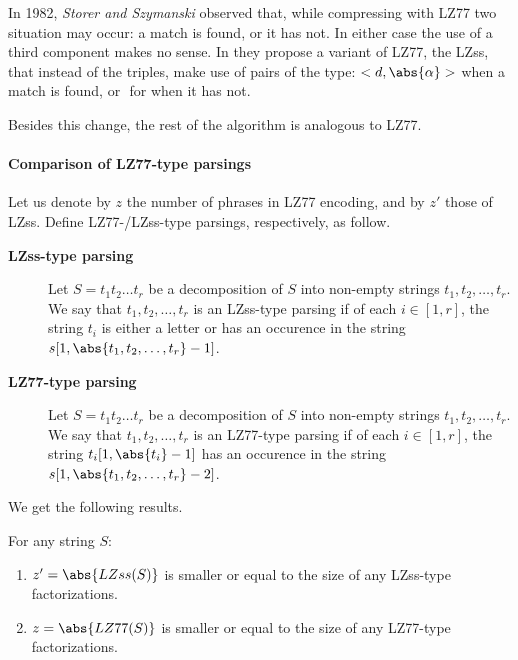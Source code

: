 \documentclass{subfiles}
\begin{document}
    In 1982, \emph{Storer \emph{and} Szymanski} observed that,
    while compressing with LZ77 two situation may occur: a match is found, or it has not.
    In either case the use of a third component makes no sense.
    In \cite{storer1982} they propose a variant of LZ77, the LZss,
    that instead of the triples, make use of pairs of the type: 
    \(<d, \abs{\alpha}>\) when a match is found, or \(<0, c>\) for when it has not.

    Besides this change, the rest of the algorithm is analogous to LZ77.
    
    \paragraph{Comparison of LZ77-type parsings}
    Let us denote by \(z\) the number of phrases in LZ77 encoding, and by \(z'\) those of LZss.
    Define LZ77-/LZss-type parsings, respectively, as follow.

    \begin{description}
        \item [\textbf{LZss-type parsing}] Let \(S = t_{1}t_{2}\ldots t_{r}\) be a decomposition of 
            \(S\) into non-empty strings \(t_{1},t_{2}, \ldots, t_{r}\). 
            We say that \(t_{1},t_{2}, \ldots, t_{r}\) is an LZss-type parsing 
            if of each \(i \in [1, r]\), the string \(t_{i}\) is either a letter or 
            has an occurence in the string \(s[1,\abs{t_{1},t_{2}, \ldots, t_{r}} - 1]\).

        \item [\textbf{LZ77-type parsing}]  Let \(S = t_{1}t_{2}\ldots t_{r}\) be a decomposition of 
            \(S\) into non-empty strings \(t_{1},t_{2}, \ldots, t_{r}\). 
            We say that \(t_{1},t_{2}, \ldots, t_{r}\) is an LZ77-type parsing
            if of each \(i \in [1, r]\), the string \(t_{i}[1, \abs{t_{i}} - 1]\) 
            has an occurence in the string \(s[1,\abs{t_{1},t_{2}, \ldots, t_{r}} - 2]\).
    \end{description} 

    We get the following results.
    \begin{lemma*}
        For any string \(S\):
        \begin{enumerate}
            \item \(z' = \abs{LZss(S)}\) is smaller or equal to the size of any LZss-type
                factorizations.
            \item \(z = \abs{LZ77(S)}\) is smaller or equal to the size of any LZ77-type 
                factorizations.
        \end{enumerate}
    \end{lemma*}
\end{document}
